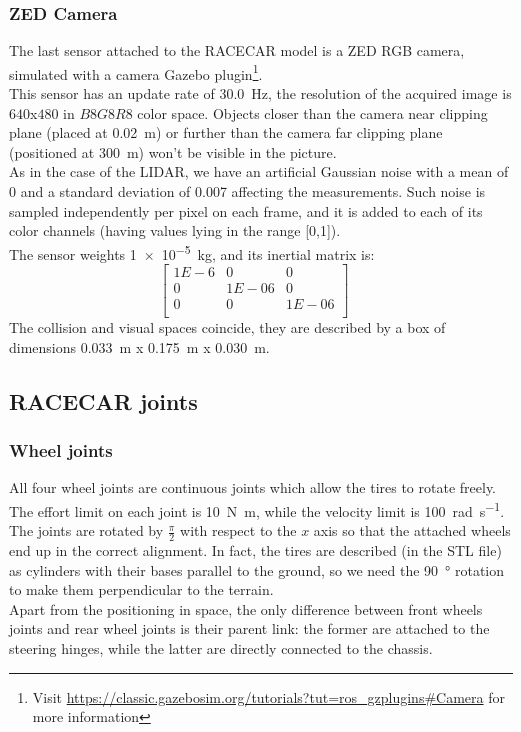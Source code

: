 \subsubsection{ZED Camera}
The last sensor attached to the RACECAR model is a ZED RGB camera, simulated with a camera Gazebo plugin\footnote{Visit 
\url{https://classic.gazebosim.org/tutorials?tut=ros_gzplugins\#Camera} for more information}.\\
This sensor has an update rate of \SI{30.0}{\hertz}, the resolution of the acquired image is $640$x$480$ in $B8G8R8$ color space.
Objects closer than the camera near clipping plane (placed at \SI{0.02}{\metre}) or further than the camera far clipping plane 
(positioned at \SI{300}{\metre}) won't be visible in the picture. \\
As in the case of the LIDAR, we have an artificial Gaussian noise with a mean 
of 0 and a standard deviation of 0.007 affecting the measurements. Such noise is sampled independently per pixel on each frame,
and it is added to each of its color channels (having values lying in the range [0,1]). \\
The sensor weights \SI{1e-5}{\kilogram}, and its inertial matrix is:
$$
\begin{bmatrix}
1E-6 & 0 & 0 \\
0 & 1E-06 & 0 \\
0 & 0 & 1E-06 \\
\end{bmatrix}
\quad
$$
The collision and visual spaces coincide, they are described by a box of dimensions 
\SI{0.033}{\metre} x \SI{0.175}{\metre} x \SI{0.030}{\metre}. \\

\subsection{RACECAR joints}
\subsubsection{Wheel joints}
All four wheel joints are continuous joints which allow the tires to rotate freely. \\
The effort limit on each joint is \SI[inter-unit-product =\ensuremath{\cdot}]{10}{\newton\metre}, while the 
velocity limit is \SI[per-mode = symbol]{100}{\radian \per \second}.
The joints are rotated by $\frac{\pi}{2}$ with respect to the $x$ axis so that the attached wheels end up in the 
correct alignment. In fact, the tires are described (in the STL file) as cylinders with their bases parallel to the ground,
so we need the \SI{90}{\degree} rotation to make them perpendicular to the terrain. \\
Apart from the positioning in space, the only difference between front wheels joints and rear wheel joints is their parent link:
the former are attached to the steering hinges, while the latter are directly connected to the chassis.


